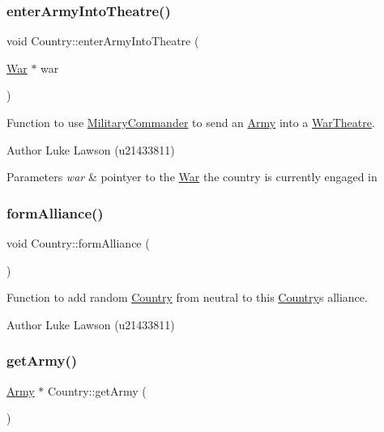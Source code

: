 \subsubsection{\texorpdfstring{enterArmyIntoTheatre()}{enterArmyIntoTheatre()}}
{\footnotesize\ttfamily void Country\+::enter\+Army\+Into\+Theatre (\begin{DoxyParamCaption}\item[{\mbox{\hyperlink{class_war}{War}} $\ast$}]{war }\end{DoxyParamCaption})}



Function to use \mbox{\hyperlink{class_military_commander}{Military\+Commander}} to send an \mbox{\hyperlink{class_army}{Army}} into a \mbox{\hyperlink{class_war_theatre}{War\+Theatre}}. 

\begin{DoxyAuthor}{Author}
Luke Lawson (u21433811) 
\end{DoxyAuthor}

\begin{DoxyParams}{Parameters}
{\em war} & pointyer to the \mbox{\hyperlink{class_war}{War}} the country is currently engaged in \\
\hline
\end{DoxyParams}
\mbox{\label{class_country_a1ff39065671bb89e426c97efed4c80e9}} 
\subsubsection{\texorpdfstring{formAlliance()}{formAlliance()}}
{\footnotesize\ttfamily void Country\+::form\+Alliance (\begin{DoxyParamCaption}{ }\end{DoxyParamCaption})}



Function to add random \mbox{\hyperlink{class_country}{Country}} from neutral to this \mbox{\hyperlink{class_country}{Country}}\textquotesingle{}s alliance. 

\begin{DoxyAuthor}{Author}
Luke Lawson (u21433811) 
\end{DoxyAuthor}
\mbox{\label{class_country_a3959c7dc7ade25ff431098fffea6156a}} 
\subsubsection{\texorpdfstring{getArmy()}{getArmy()}}
{\footnotesize\ttfamily \mbox{\hyperlink{class_army}{Army}} $\ast$ Country\+::get\+Army (\begin{DoxyParamCaption}{ }\end{DoxyParamCaption})}



